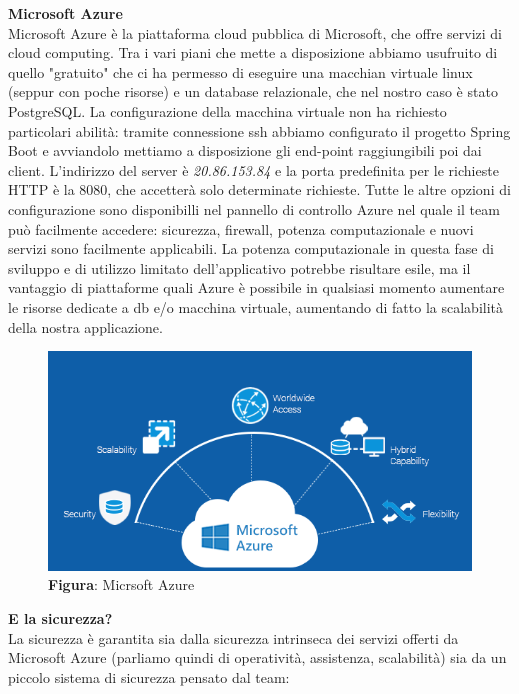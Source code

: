     \begin{flushleft}
        \textbf{Microsoft Azure}\\
        Microsoft Azure è la piattaforma cloud pubblica di Microsoft, che offre servizi di cloud computing. Tra i vari piani che mette a disposizione abbiamo usufruito
        di quello "gratuito" che ci ha permesso di eseguire una macchian virtuale linux (seppur con poche risorse) e un database relazionale, che nel nostro caso è stato PostgreSQL.
        La configurazione della macchina virtuale non ha richiesto particolari abilità: tramite connessione ssh abbiamo configurato il progetto Spring Boot e avviandolo 
        mettiamo a disposizione gli end-point raggiungibili poi dai client.
        L'indirizzo del server è \emph{20.86.153.84} e la porta predefinita per le richieste HTTP è la 8080, che accetterà solo determinate richieste.
        Tutte le altre opzioni di configurazione sono disponibilli nel pannello di controllo Azure nel quale il team può facilmente accedere: sicurezza, firewall, potenza computazionale e nuovi servizi sono facilmente applicabili.
        La potenza computazionale in questa fase di sviluppo e di utilizzo limitato dell'applicativo potrebbe risultare esile, ma il vantaggio di piattaforme quali
        Azure è possibile in qualsiasi momento aumentare le risorse dedicate a db e/o macchina virtuale, aumentando di fatto la scalabilità della nostra applicazione.
    \end{flushleft}

    \begin{figure}[H]
        \centering
        \includegraphics[scale=0.5]{assets/immagini varie/azure loc.png}
        \caption*{\textbf{Figura}: Micrsoft Azure}\label{fig:mic_az}
    \end{figure}
    \newpage
    \begin{flushleft}
        \textbf{E la sicurezza?}\\
        La sicurezza è garantita sia dalla sicurezza intrinseca dei servizi offerti da Microsoft Azure (parliamo quindi di operatività, assistenza, scalabilità) sia da un piccolo sistema di sicurezza pensato dal team:
    \end{flushleft}

